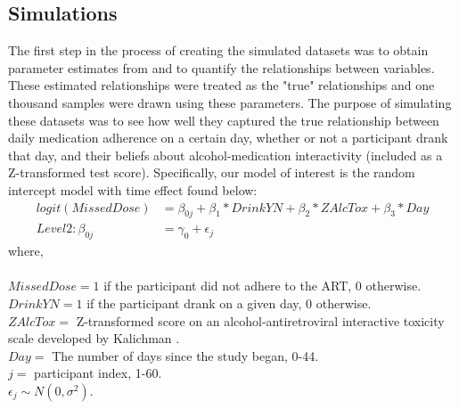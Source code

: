 \documentclass{svjour3}                     %
\begin{document}
\subsection{Simulations}
\label{sec:2.2}
The first step in the process of creating the simulated datasets was to obtain parameter estimates from \citet{pellowski2016alcohol} and to quantify the relationships between variables. These estimated relationships were treated as the "true" relationships and one thousand samples were drawn using these parameters. The purpose of simulating these datasets was to see how well they captured the true relationship between daily medication adherence on a certain day, whether or not a participant drank that day, and their beliefs about alcohol-medication interactivity (included as a Z-transformed test score). Specifically, our model of interest is the random intercept model with time effect found below: \\

\begin{align*}
logit(MissedDose) &= \beta_{0j} + \beta_1*DrinkYN + \beta_2*ZAlcTox +\beta_3*Day \\
Level 2: \beta_{0j} &= \gamma_0 + \epsilon_j
\end{align*}
where, \\ \\
$MissedDose = 1$ if the participant did not adhere to the ART, 0 otherwise. \\
$DrinkYN = 1$ if the participant drank on a given day, 0 otherwise.\\
$ZAlcTox =$ Z-transformed score on an alcohol-antiretroviral interactive toxicity scale developed by Kalichman \cite{kalichman2009prevalence}. \\
$Day =$ The number of days since the study began, 0-44. \\
$j =$ participant index, 1-60. \\
$\epsilon_j  \sim N(0, \sigma^2)$. \\ \\
\end{document}
